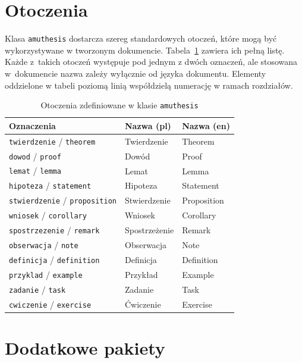 \documentclass[oneside]{amuthesis}
\begin{document}
\section{Otoczenia}

Klasa \texttt{amuthesis} dostarcza szereg standardowych otoczeń, które mogą być wykorzystywane w tworzonym dokumencie. Tabela~\ref{table:amuthesis-otoczenia} zawiera ich pełną listę. Każde z~takich otoczeń występuje pod jednym z dwóch oznaczeń, ale stosowana w~dokumencie nazwa zależy wyłącznie od języka dokumentu. Elementy oddzielone w tabeli poziomą linią współdzielą numerację w ramach rozdziałów.

\begin{table}
  \caption{Otoczenia zdefiniowane w klasie \texttt{amuthesis}}
  \label{table:amuthesis-otoczenia}
  \centering
  \begin{tabular}{lll}
    \toprule
    Oznaczenia & Nazwa (pl) & Nazwa (en)\\
    \midrule
    \texttt{twierdzenie} / \texttt{theorem} & Twierdzenie & Theorem\\
    \texttt{dowod} / \texttt{proof} & Dowód & Proof\\
    \texttt{lemat} / \texttt{lemma} & Lemat & Lemma\\
    \texttt{hipoteza} / \texttt{statement} & Hipoteza & Statement\\
    \texttt{stwierdzenie} / \texttt{proposition} & Stwierdzenie & Proposition\\
    \texttt{wniosek} / \texttt{corollary} & Wniosek & Corollary\\
    \texttt{spostrzezenie} / \texttt{remark} & Spostrzeżenie & Remark\\
    \texttt{obserwacja} / \texttt{note} & Obserwacja & Note\\
    \midrule
    \texttt{definicja} / \texttt{definition} & Definicja & Definition\\
    \midrule
    \texttt{przyklad} / \texttt{example} & Przykład & Example\\
    \midrule
    \texttt{zadanie} / \texttt{task} & Zadanie & Task\\
    \texttt{cwiczenie} / \texttt{exercise} & Ćwiczenie & Exercise\\
    \bottomrule
  \end{tabular}
\end{table}

\section{Dodatkowe pakiety}
\end{document}
